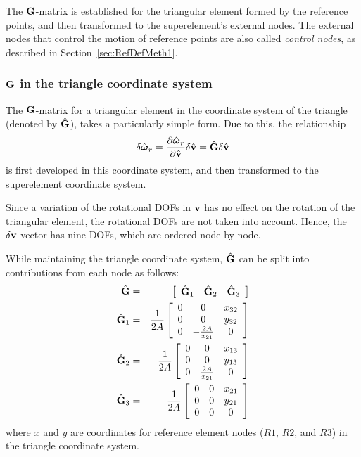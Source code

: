 {The $\tilde{\bf G}$-matrix is established for the triangular element formed by
the reference points, and then transformed to the superelement's external nodes.
The external nodes that control the motion of reference points are also called
{\it control nodes}, as described in Section~\ref{sec:RefDefMeth1}.

\subsubsection{${\bf G}$ in the triangle coordinate system}

The ${\bf G}$-matrix for a triangular element in the coordinate system of the
triangle (denoted by $\hat{\bf G}$), takes a particularly simple form.
Due to this, the relationship
%
\begin{equation}
\delta\hat{\boldsymbol{\omega}}_r =
\frac{\partial\hat{\boldsymbol{\omega}}_r}{\partial\hat{\bf v}}\delta\hat{\bf v} =
\hat{\bf G}\delta\hat{\bf v}
\label{eqSC:RigRotGradTriSys}
\end{equation}
%
is first developed in this coordinate system, and then transformed to the
superelement coordinate system.

Since a variation of the rotational DOFs in ${\bf v}$ has no effect on the
rotation of the triangular element, the rotational DOFs are not taken into
account.
Hence, the $\delta{\bf v}$ vector has nine DOFs, which are ordered node by node.

While maintaining the triangle coordinate system, $\hat{\bf G}$ can be split
into contributions from each node as follows:
%
\begin{eqnarray}
\hat{\mf G} &=& \left[\begin{array}{ccc}
\hat{\mf G}_1 & \hat{\mf G}_2 & \hat{\mf G}_3
\end{array}\right] \label{eqSC:618} \\
%
\hat{\mf G}_1 &=& \frac{1}{2A} \left[\begin{array}{ccc}
0 & 0 & x_{32} \\
0 & 0 & y_{32} \\
0 & -\frac{2A}{x_{21}} & 0
\end{array}\right] \nonumber \\
%
\hat{\mf G}_2 &=& \frac{1}{2A} \left[\begin{array}{ccc}
0 & 0 & x_{13} \\
0 & 0 & y_{13} \\
0 & \frac{2A}{x_{21}} & 0
\end{array}\right] \nonumber \\
%
\hat{\mf G}_3 &=& \frac{1}{2A} \left[\begin{array}{ccc}
0 & 0 & x_{21} \\
0 & 0 & y_{21} \\
0 & 0 & 0
\end{array}\right] \nonumber
\end{eqnarray}
%
where $x$ and $y$ are coordinates for reference element nodes
($R1$, $R2$, and $R3$) in the triangle coordinate system.

}
